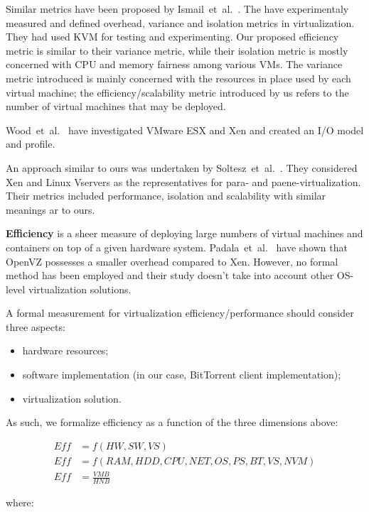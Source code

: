 Similar metrics have been proposed by Ismail~et~al.~\cite{virt-metrics}. The
have experimentaly measured and defined overhead, variance and isolation
metrics in virtualization. They had used KVM for testing and experimenting.
Our proposed efficiency metric is similar to their variance metric, while
their isolation metric is mostly concerned with CPU and memory fairness among
various VMs. The variance metric introduced is mainly concerned with the
resources in place used by each virtual machine; the efficiency/scalability
metric introduced by us refers to the number of virtual machines that may be
deployed.

Wood~et~al.~\cite{virt-prof-model} have investigated VMware ESX and Xen and
created an I/O model and profile.

An approach similar to ours was undertaken by
Soltesz~et~al.~\cite{virt-doppel}. They considered Xen and Linux Vservers as
the representatives for para- and paene-virtualization. Their metrics included
performance, isolation and scalability with similar meanings ar to ours.

\textbf{Efficiency} is a sheer measure of deploying large numbers of virtual
machines and containers on top of a given hardware system.
Padala~et~al.~\cite{eval-virt-performance} have shown that OpenVZ possesses a
smaller overhead compared to Xen. However, no formal method has been employed
and their study doesn't take into account other OS-level virtualization
solutions.

A formal measurement for virtualization efficiency/performance should consider
three aspects:

\begin{itemize}
  \item hardware resources;
  \item software implementation (in our case, BitTorrent client
  implementation);
  \item virtualization solution.
\end{itemize}

As such, we formalize efficiency as a function of the three dimensions above:

\begin{align}
Eff & = f(HW, SW, VS)\\
Eff & = f(RAM, HDD, CPU, NET, OS, PS, BT, VS, NVM)\\
Eff &= \frac{VMB}{HNB}
\end{align}

where:

